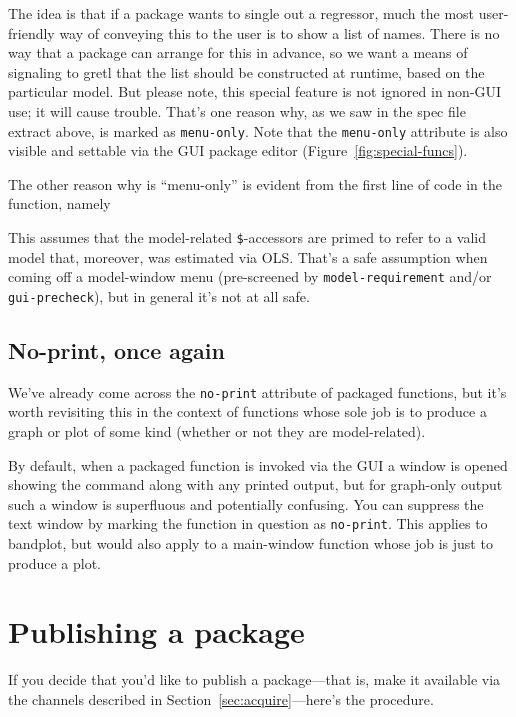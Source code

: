 \documentclass[oneside]{book}
\begin{document}
The idea is that if a package wants to single out a regressor, much
the most user-friendly way of conveying this to the user is to show a
list of names. There is no way that a package can arrange for this in
advance, so we want a means of signaling to gretl that the list should
be constructed at runtime, based on the particular model. But please
note, this special feature is not ignored in non-GUI use; it will
cause trouble. That's one reason why, as we saw in the spec file
extract above,  is marked as \texttt{menu-only}.
Note that the \texttt{menu-only} attribute is also visible and
settable via the GUI package editor (Figure~\ref{fig:special-funcs}).

The other reason why  is ``menu-only'' is
evident from the first line of code in the function, namely
%
This assumes that the model-related \texttt{\$}-accessors are primed
to refer to a valid model that, moreover, was estimated via
OLS. That's a safe assumption when coming off a model-window menu
(pre-screened by \texttt{model-requirement} and/or
\texttt{gui-precheck}), but in general it's not at all safe.

\subsection{No-print, once again}

We've already come across the \texttt{no-print} attribute of packaged
functions, but it's worth revisiting this in the context of functions
whose sole job is to produce a graph or plot of some kind (whether or
not they are model-related).

By default, when a packaged function is invoked via the GUI a window
is opened showing the command along with any printed output, but for
graph-only output such a window is superfluous and potentially
confusing.  You can suppress the text window by marking the function
in question as \texttt{no-print}. This applies to bandplot, but
would also apply to a main-window function whose job is just to
produce a plot.

\section{Publishing a package}
\label{sec:publish}

If you decide that you'd like to publish a package---that is, make it
available via the channels described in
Section~\ref{sec:acquire}---here's the procedure.
\end{document}
